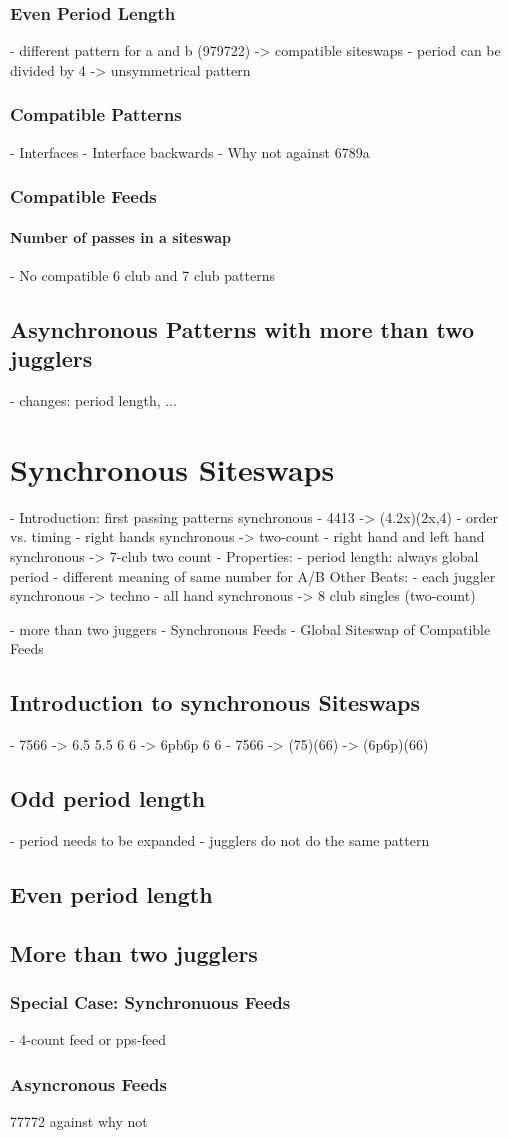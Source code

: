 \documentclass[a4paper,12pt,parskip=full]{scrreprt}
\begin{document}
	\subsection{Even Period Length}
	 - different pattern for a and b (979722) -> compatible siteswaps
	 - period can be divided by 4 -> unsymmetrical pattern
	\subsection{Compatible Patterns}
	 - Interfaces
	 - Interface backwards
	 - Why not against 6789a
	\subsection{Compatible Feeds}
	\subsubsection{Number of passes in a siteswap}
	- No compatible 6 club and 7 club patterns
	\section{Asynchronous Patterns with more than two jugglers}
	- changes: period length, ...
	\chapter{Synchronous Siteswaps}
	- Introduction: first passing patterns synchronous
	- 4413 -> (4.2x)(2x,4)
	- order vs. timing
	- right hands synchronous -> two-count
	- right hand and left hand synchronous -> 7-club two count
	- Properties:
	    - period length: always global period
	    - different meaning of same number for A/B
	Other Beats:
	- each juggler synchronous -> techno
	- all hand synchronous -> 8 club singles (two-count)
	
	- more than two juggers
	- Synchronous Feeds
	- Global Siteswap of Compatible Feeds
	
	\section{Introduction to synchronous Siteswaps}
	- 7566  ->  6.5  5.5  6  6  -> 6pb6p 6 6
	- 7566  -> (75)(66) -> (6p6p)(66)
	\section{Odd period length}
	- period needs to be expanded
	- jugglers do not do the same pattern
	
	\section{Even period length}
	\section{More than two jugglers}
	\subsection{Special Case: Synchronuous Feeds}
	- 4-count feed or pps-feed
	\subsection{Asyncronous Feeds}
	77772 against why not
	
	
\end{document}
